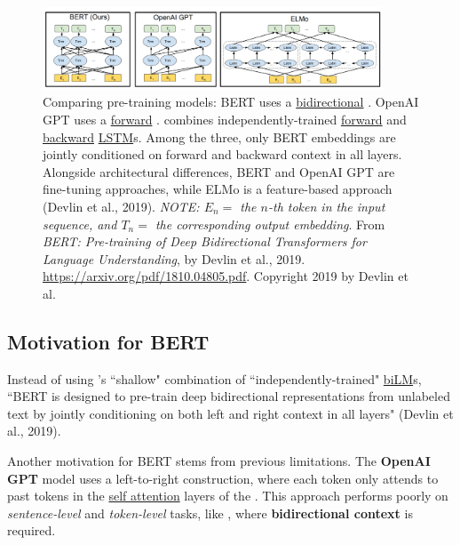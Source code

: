 \begin{figure}[h]
\vspace{-5pt}
\centering
\includegraphics[width=0.9\textwidth]{imgs/bert_vs_elmo_vs_gpt.png}
\vspace{-5pt}
\caption{\footnotesize Comparing pre-training models: BERT uses a \hyperref[sec:BidirectionalLM]{bidirectional} . OpenAI GPT uses a \hyperref[sec:ForwardLM]{forward} .  combines independently-trained \hyperref[sec:ForwardLM]{forward} and \hyperref[sec:BackwardLM]{backward} \hyperref[sec:LSTM]{LSTM}s. Among the three, only BERT embeddings are jointly conditioned on forward and backward context in all layers. Alongside architectural differences, BERT and OpenAI GPT are fine-tuning approaches, while ELMo is a feature-based approach (Devlin et al., 2019). \textit{NOTE: $E_n =$ the $n$-th token in the input sequence, and $T_n =$ the corresponding output embedding}. From \emph{BERT: Pre-training of Deep Bidirectional Transformers for Language Understanding}, by Devlin et al., 2019. \url{https://arxiv.org/pdf/1810.04805.pdf}. Copyright 2019 by Devlin et al.}
\vspace{-5pt}
\label{fig:NAME}
\end{figure}





\subsection{Motivation for BERT} \label{sec:MotivationForBERT}

Instead of using 's ``shallow" combination of ``independently-trained" \hyperref[sec:BidirectionalLM]{biLM}s, ``BERT is designed to pre-train deep bidirectional representations from unlabeled text by jointly conditioning on both left and right context in all layers" (Devlin et al., 2019).   


Another motivation for BERT stems from previous limitations. The \textbf{OpenAI GPT} model uses a left-to-right construction, where each token only attends to past tokens in the \hyperref[sec:SelfAttention]{self attention} layers of the . This approach performs poorly on \emph{sentence-level} and \emph{token-level} tasks, like , where \textbf{bidirectional context} is required.  

